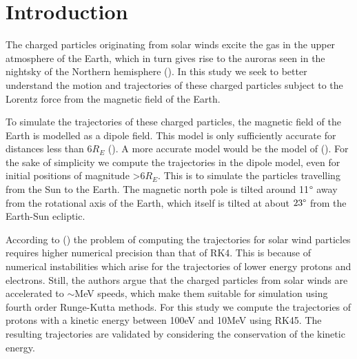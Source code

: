 \section{Introduction}
The charged particles originating from solar winds excite the gas in the upper atmosphere of the Earth, which in turn gives rise to the auroras seen in the nightsky of the Northern hemisphere (\cite{chen_2015}). 
In this study we seek to better understand the motion and trajectories of these charged particles subject to the Lorentz force from the magnetic field of the Earth. 

To simulate the trajectories of these charged particles, the magnetic field of the Earth is modelled  as a dipole field. 
This model is only sufficiently accurate for distances less than $6R_E$ (\cite{soni_2021}). 
A more accurate model would be the model of (\cite{hones_1963}).
For the sake of simplicity we compute the trajectories in the dipole model, even for initial positions of magnitude >$6R_E$. 
This is to simulate the particles travelling from the Sun to the Earth.
The magnetic north pole is tilted around 11$\degree$ away from the rotational axis of the Earth, which itself is tilted at about $23\degree$ from the Earth-Sun ecliptic.

According to (\cite{soni_2021}) the problem of computing the trajectories for solar wind particles requires higher numerical precision than that of RK4. 
This is because of numerical instabilities which arise for the trajectories of lower energy protons and electrons. 
Still, the authors argue that the charged particles from solar winds are accelerated to $\sim$MeV speeds, which make them suitable for simulation using fourth order Runge-Kutta methods. 
For this study we compute the trajectories of protons with a kinetic energy between 100eV and 10MeV  using RK45.
The resulting trajectories are validated by considering the conservation of the kinetic energy.